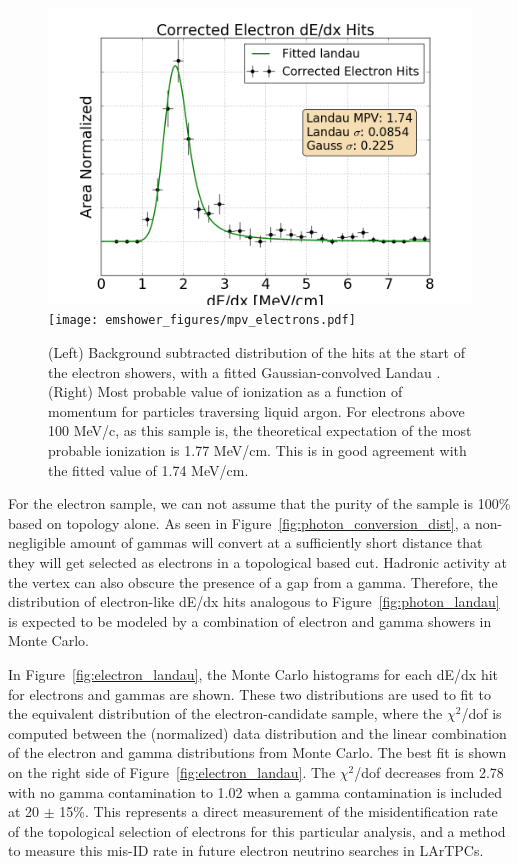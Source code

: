 \begin{figure}[p]
  \centering
  \includegraphics[width=\textwidth]{emshower_figures/fitted_electron_landau.png}
  \texttt{[image: emshower\_figures/mpv\_electrons.pdf]}
  \caption{(Left) Background subtracted distribution of the hits at the start of the electron showers, with a fitted Gaussian-convolved Landau .  (Right) Most probable value of ionization as a function of momentum for particles traversing liquid argon.  For electrons above 100 MeV/c, as this sample is, the theoretical expectation of the most probable ionization is 1.77 MeV/cm.  This is in good agreement with the fitted value of 1.74 MeV/cm.}
  \label{fig:mpv_electrons}
 \end{figure} 



For the electron sample, we can not assume that the purity of the sample is 100\% based on topology alone.  As seen in Figure~\ref{fig:photon_conversion_dist}, a non-negligible amount of gammas will convert at a sufficiently short distance that they will get selected as electrons in a topological based cut.  Hadronic activity at the vertex can also obscure the presence of a gap from a gamma.  Therefore, the distribution of electron-like dE/dx hits analogous to Figure~\ref{fig:photon_landau} is expected to be modeled by a combination of electron and gamma showers in Monte Carlo.

In Figure~\ref{fig:electron_landau}, the Monte Carlo histograms for each dE/dx hit for electrons and gammas are shown.  These two distributions are used to fit to the equivalent distribution of the electron-candidate sample, where the $\chi^2$/dof is computed between the (normalized) data distribution and the linear combination of the electron and gamma distributions from Monte Carlo.  The best fit is shown on the right side of Figure~\ref{fig:electron_landau}.  The $\chi^2$/dof decreases from 2.78 with no gamma contamination to 1.02 when a gamma contamination is included at 20 $\pm$ 15\%.  This represents a direct measurement of the misidentification rate of the topological selection of electrons for this particular analysis, and a method to measure this mis-ID rate in future electron neutrino searches in LArTPCs.

